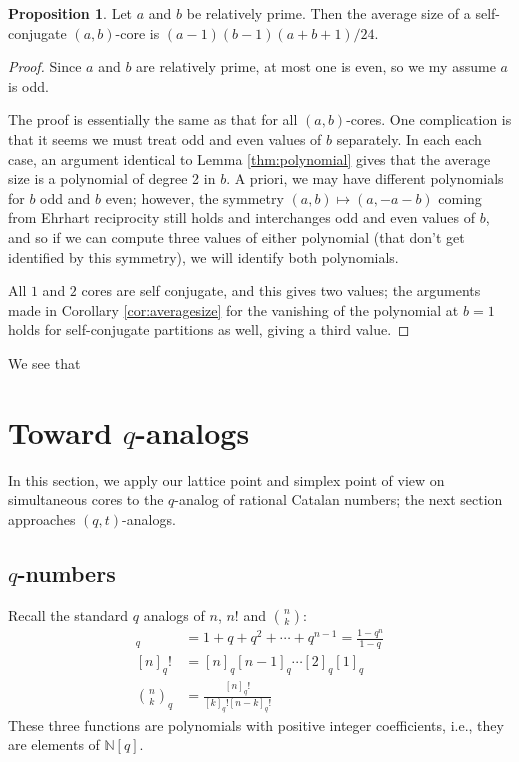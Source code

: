 \documentclass{amsart}[12pt]
\theoremstyle{definition}
\newtheorem{proposition}[dummy]{Proposition}
\newcommand{\N}{\mathbb{N}}
\begin{document}
\begin{proposition} \label{prop:conjugatesize}
Let $a$ and $b$ be relatively prime.  Then the average size of a self-conjugate $(a,b)$-core is $(a-1)(b-1)(a+b+1)/24$.
\end{proposition}


\begin{proof}

Since $a$ and $b$ are relatively prime, at most one is even, so we my assume $a$ is odd.  

The proof is essentially the same as that for all $(a,b)$-cores.  One complication is that it seems we must treat odd and even values of $b$ separately.   In each each case, an argument identical to Lemma \ref{thm:polynomial} gives that the average size is a polynomial of degree 2 in $b$.  A priori, we may have different polynomials for $b$ odd and $b$ even; however, the symmetry $(a,b)\mapsto (a, -a-b)$ coming from Ehrhart reciprocity still holds and interchanges odd and even values of $b$, and so if we can compute three values of either polynomial (that don't get identified by this symmetry), we will identify both polynomials.

All $1$ and $2$ cores are self conjugate, and this gives two values; the arguments made in Corollary \ref{cor:averagesize} for the vanishing of the polynomial at $b=1$ holds for self-conjugate partitions as well, giving a third value.

\end{proof}


  We see that





\section{Toward \texorpdfstring{$q$}{q}-analogs} \label{sec:qcat}
In this section, we apply our lattice point and simplex point of view on simultaneous cores to the $q$-analog of rational Catalan numbers; the next section approaches $(q,t)$-analogs.

\subsection{\texorpdfstring{$q$}{q}-numbers}





Recall the standard $q$ analogs of $n$, $n!$ and $\binom{n}{k}$:
\begin{align*}
[n]_q&=1+q+q^2+\cdots+q^{n-1}=\frac{1-q^n}{1-q} \\
[n]_q!&=[n]_q[n-1]_q\cdots [2]_q[1]_q \\
\binom{n}{k}_q&=\frac{[n]_q!}{[k]_q![n-k]_q!}
\end{align*}
These three functions are polynomials with positive integer coefficients, i.e., they are elements of $\N[q]$.
\end{document}
